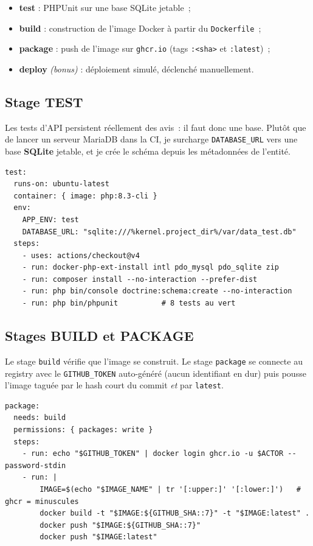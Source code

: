 \documentclass[11pt,a4paper]{article}
\begin{document}
\begin{itemize}
  \item \textbf{test} : PHPUnit sur une base SQLite jetable~;
  \item \textbf{build} : construction de l'image Docker à partir du \texttt{Dockerfile}~;
  \item \textbf{package} : push de l'image sur \texttt{ghcr.io} (tags \texttt{:<sha>} et \texttt{:latest})~;
  \item \textbf{deploy} \emph{(bonus)} : déploiement simulé, déclenché manuellement.
\end{itemize}

\subsection{Stage TEST}

Les tests d'API persistent réellement des avis~: il faut donc une base. Plutôt que de lancer un
serveur MariaDB dans la CI, je surcharge \texttt{DATABASE\_URL} vers une base \textbf{SQLite}
jetable, et je crée le schéma depuis les métadonnées de l'entité.

\begin{lstlisting}
test:
  runs-on: ubuntu-latest
  container: { image: php:8.3-cli }
  env:
    APP_ENV: test
    DATABASE_URL: "sqlite:///%kernel.project_dir%/var/data_test.db"
  steps:
    - uses: actions/checkout@v4
    - run: docker-php-ext-install intl pdo_mysql pdo_sqlite zip
    - run: composer install --no-interaction --prefer-dist
    - run: php bin/console doctrine:schema:create --no-interaction
    - run: php bin/phpunit          # 8 tests au vert
\end{lstlisting}

\subsection{Stages BUILD et PACKAGE}

Le stage \texttt{build} vérifie que l'image se construit. Le stage \texttt{package} se connecte au
registry avec le \texttt{GITHUB\_TOKEN} auto-généré (aucun identifiant en dur) puis pousse l'image
taguée par le hash court du commit \emph{et} par \texttt{latest}.

\begin{lstlisting}
package:
  needs: build
  permissions: { packages: write }
  steps:
    - run: echo "$GITHUB_TOKEN" | docker login ghcr.io -u $ACTOR --password-stdin
    - run: |
        IMAGE=$(echo "$IMAGE_NAME" | tr '[:upper:]' '[:lower:]')   # ghcr = minuscules
        docker build -t "$IMAGE:${GITHUB_SHA::7}" -t "$IMAGE:latest" .
        docker push "$IMAGE:${GITHUB_SHA::7}"
        docker push "$IMAGE:latest"
\end{lstlisting}
\end{document}
